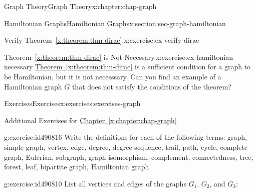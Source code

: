 \documentclass[oneside,10pt,]{book}
\newcommand{\xreffont}{\relax}
\numberwithin{equation}{section}
\begin{document}
\begin{chapterptx}{Graph Theory}{}{Graph Theory}{}{}{x:chapter:chap-graph}
\begin{sectionptx}{Hamiltonian Graphs}{}{Hamiltonian Graphs}{}{}{x:section:sec-graph-hamiltonian}
\begin{inlineexercise}{Verify Theorem~{\xreffont\ref*{x:theorem:thm-dirac}}.}{x:exercise:ex-verify-dirac}
\begin{sidebyside}{1}{0.325}{0.325}{0}
\begin{sbspanel}{0.35}
{
}%
\end{sbspanel}%
\end{sidebyside}%
\end{inlineexercise}
\begin{inlineexercise}{Theorem~{\xreffont\ref*{x:theorem:thm-dirac}} is Not Necessary.}{x:exercise:ex-hamiltonian-necessary}%
\hyperref[x:theorem:thm-dirac]{Theorem~{\xreffont\ref{x:theorem:thm-dirac}}} is a sufficient condition for a graph to be Hamiltonian, but it is not necesssary. Can you find an example of a Hamiltonian graph \(G\) that does not satisfy the conditions of the theorem?%
\end{inlineexercise}
\end{sectionptx}
%
%
\typeout{************************************************}
\typeout{************************************************}
%
\begin{exercises-section}{Exercises}{}{Exercises}{}{}{x:exercises:exercises-graph}
\begin{introduction}{}%
Additional Exercises for \hyperref[x:chapter:chap-graph]{Chapter~{\xreffont\ref{x:chapter:chap-graph}}}%
\end{introduction}%
\begin{divisionexercise}{1}{}{}{g:exercise:id490816}%
Write the definitions for each of the following terms: graph, simple graph, vertex, edge, degree, degree sequence, trail, path, cycle, complete graph, Eulerian, subgraph, graph isomorphism, complement, connectedness, tree, forest, leaf, bipartite graph, Hamiltonian graph.%
\end{divisionexercise}%
\begin{divisionexercise}{2}{}{}{g:exercise:id490810}%
List all vertices and edges of the graphs \(G_1\), \(G_2\), and \(G_3\):%
\begin{sidebyside}{3}{0.0516666666666667}{0.0516666666666667}{0.103333333333333}%

\end{sidebyside}
\end{divisionexercise}
\end{exercises-section}
\end{chapterptx}
\end{document}
